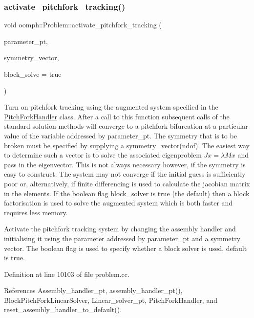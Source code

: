 \subsubsection{\texorpdfstring{activate\+\_\+pitchfork\+\_\+tracking()}{activate\_pitchfork\_tracking()}}
{\footnotesize\ttfamily void oomph\+::\+Problem\+::activate\+\_\+pitchfork\+\_\+tracking (\begin{DoxyParamCaption}\item[{double $\ast$const \&}]{parameter\+\_\+pt,  }\item[{const \hyperlink{classoomph_1_1DoubleVector}{Double\+Vector} \&}]{symmetry\+\_\+vector,  }\item[{const bool \&}]{block\+\_\+solve = {\ttfamily true} }\end{DoxyParamCaption})}



Turn on pitchfork tracking using the augmented system specified in the \hyperlink{classoomph_1_1PitchForkHandler}{Pitch\+Fork\+Handler} class. After a call to this function subsequent calls of the standard solution methods will converge to a pitchfork bifurcation at a particular value of the variable addressed by parameter\+\_\+pt. The symmetry that is to be broken must be specified by supplying a symmetry\+\_\+vector(ndof). The easiest way to determine such a vector is to solve the associated eigenproblem $ Jx = \lambda M x$ and pass in the eigenvector. This is not always necessary however, if the symmetry is easy to construct. The system may not converge if the initial guess is sufficiently poor or, alternatively, if finite differencing is used to calculate the jacobian matrix in the elements. If the boolean flag block\+\_\+solver is true (the default) then a block factorisation is used to solve the augmented system which is both faster and requires less memory. 

Activate the pitchfork tracking system by changing the assembly handler and initialising it using the parameter addressed by parameter\+\_\+pt and a symmetry vector. The boolean flag is used to specify whether a block solver is used, default is true. 

Definition at line 10103 of file problem.\+cc.



References Assembly\+\_\+handler\+\_\+pt, assembly\+\_\+handler\+\_\+pt(), Block\+Pitch\+Fork\+Linear\+Solver, Linear\+\_\+solver\+\_\+pt, Pitch\+Fork\+Handler, and reset\+\_\+assembly\+\_\+handler\+\_\+to\+\_\+default().



